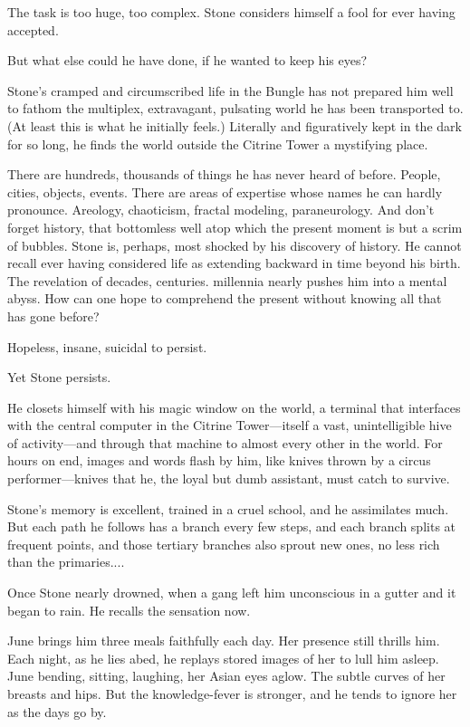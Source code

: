 The task is too huge, too complex. Stone considers himself a fool for ever having accepted.

But what else could he have done, if he wanted to keep his eyes?

Stone's cramped and circumscribed life in the Bungle has not prepared him well to fathom the multiplex, extravagant, pulsating world he has been transported to. (At least this is what he initially feels.) Literally and figuratively kept in the dark for so long, he finds the world outside the Citrine Tower a mystifying place.

There are hundreds, thousands of things he has never heard of before. People, cities, objects, events. There are areas of expertise whose names he can hardly pronounce. Areology, chaoticism, fractal modeling, paraneurology. And don't forget history, that bottomless well atop which the present moment is but a scrim of bubbles. Stone is, perhaps, most shocked by his discovery of history. He cannot recall ever having considered life as extending backward in time beyond his birth. The revelation of decades, centuries. millennia nearly pushes him into a mental abyss. How can one hope to comprehend the present without knowing all that has gone before?

Hopeless, insane, suicidal to persist.

Yet Stone persists.

He closets himself with his magic window on the world, a terminal that interfaces with the central computer in the Citrine Tower---itself a vast, unintelligible hive of activity---and through that machine to almost every other in the world. For hours on end, images and words flash by him, like knives thrown by a circus performer---knives that he, the loyal but dumb assistant, must catch to survive.

Stone's memory is excellent, trained in a cruel school, and he assimilates much. But each path he follows has a branch every few steps, and each branch splits at frequent points, and those tertiary branches also sprout new ones, no less rich than the primaries....

Once Stone nearly drowned, when a gang left him unconscious in a gutter and it began to rain. He recalls the sensation now.

June brings him three meals faithfully each day. Her presence still thrills him. Each night, as he lies abed, he replays stored images of her to lull him asleep. June bending, sitting, laughing, her Asian eyes aglow. The subtle curves of her breasts and hips. But the knowledge-fever is stronger, and he tends to ignore her as the days go by.

